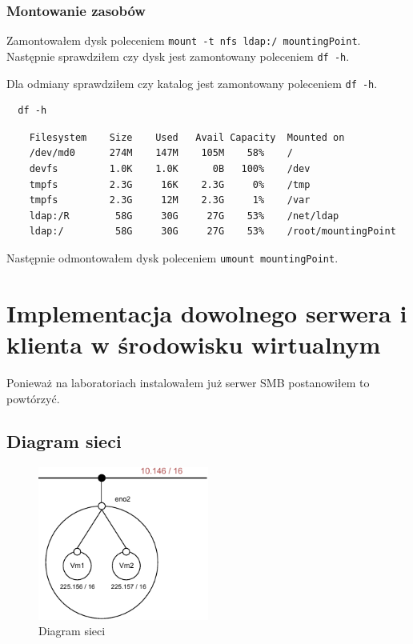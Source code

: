 \documentclass{article} %
\begin{document}
\subsubsection{Montowanie zasobów}
Zamontowałem dysk poleceniem \texttt{mount -t nfs ldap:/ mountingPoint}. Następnie sprawdziłem czy dysk jest zamontowany poleceniem \texttt{df -h}.

Dla odmiany sprawdziłem czy katalog jest zamontowany poleceniem \texttt{df -h}.
\begin{tcolorbox}[colback=yellow!10!white,colframe=red!45!black,coltitle=yellow!100!black, title=FreeBSD]
  \begin{lstlisting}
  df -h
  \end{lstlisting}
  \tcblower
  \tiny
  \begin{lstlisting}
    Filesystem    Size    Used   Avail Capacity  Mounted on
    /dev/md0      274M    147M    105M    58%    /
    devfs         1.0K    1.0K      0B   100%    /dev
    tmpfs         2.3G     16K    2.3G     0%    /tmp
    tmpfs         2.3G     12M    2.3G     1%    /var
    ldap:/R        58G     30G     27G    53%    /net/ldap
    ldap:/         58G     30G     27G    53%    /root/mountingPoint 
  \end{lstlisting}
\end{tcolorbox}
\normalsize

Następnie odmontowałem dysk poleceniem \texttt{umount mountingPoint}.

\section{Implementacja dowolnego serwera i klienta w środowisku wirtualnym}
Ponieważ na laboratoriach instalowałem już serwer SMB postanowiłem to powtórzyć.

\subsection{Diagram sieci}
\begin{figure}[h]
  \caption{Diagram sieci}
  \centering
  \includegraphics[width=0.5\textwidth]{Schemat_sieci}
\end{figure}
\end{document}
